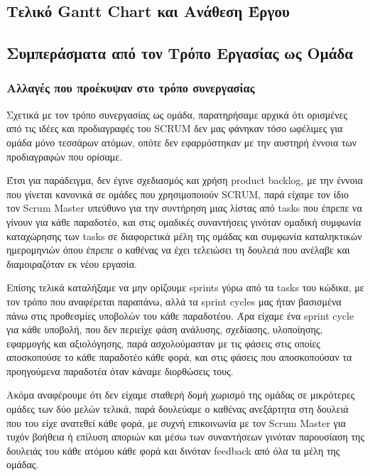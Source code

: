 \documentclass[12pt,a4paper]{article}
\begin{document}
\subsection{Τελικό Gantt Chart και Ανάθεση Έργου}

\subsection{Συμπεράσματα από τον Τρόπο Εργασίας ως Ομάδα}

\subsubsection{Αλλαγές που προέκυψαν στο τρόπο συνεργασίας}

Σχετικά με τον τρόπο συνεργασίας ως ομάδα, παρατηρήσαμε αρχικά ότι ορισμένες από τις ιδέες και προδιαγραφές του SCRUM δεν μας φάνηκαν τόσο ωφέλιμες για ομάδα μόνο τεσσάρων ατόμων, οπότε δεν εφαρμόστηκαν με την αυστηρή έννοια των προδιαγραφών που ορίσαμε.

Έτσι για παράδειγμα, δεν έγινε σχεδιασμός και χρήση product backlog, με την έννοια που γίνεται κανονικά σε ομάδες που χρησιμοποιούν SCRUM, παρά είχαμε τον ίδιο τον Scrum Master υπεύθυνο για την συντήρηση μιας λίστας από tasks που έπρεπε να γίνουν για κάθε παραδοτέο, και στις ομαδικές συναντήσεις γινόταν ομαδική συμφωνία καταχώρησης των tasks σε διαφορετικά μέλη της ομάδας και συμφωνία καταληκτικών ημερομηνιών όπου έπρεπε ο καθένας να έχει τελειώσει τη δουλειά που ανέλαβε και διαμοιραζόταν εκ νέου εργασία.

Επίσης τελικά καταλήξαμε να μην ορίζουμε sprints γύρω από τα tasks του κώδικα, με τον τρόπο που αναφέρεται παραπάνω, αλλά τα sprint cycles μας ήταν βασισμένα πάνω στις προθεσμίες υποβολών του κάθε παραδοτέου. Άρα είχαμε ένα sprint cycle για κάθε υποβολή, που δεν περιείχε φάση ανάλυσης, σχεδίασης, υλοποίησης, εφαρμογής και αξιολόγησης, παρά ασχολούμασταν με τις φάσεις στις οποίες αποσκοπούσε το κάθε παραδοτέο κάθε φορά, και στις φάσεις που αποσκοπούσαν τα προηγούμενα παραδοτέα όταν κάναμε διορθώσεις τους.

Ακόμα αναφέρουμε ότι δεν είχαμε σταθερή δομή χωρισμό της ομάδας σε μικρότερες ομάδες των δύο μελών τελικά, παρά δουλεύαμε ο καθένας ανεξάρτητα στη δουλειά που του είχε ανατεθεί κάθε φορά, με συχνή επικοινωνία με τον Scrum Master για τυχόν βοήθεια ή επίλυση αποριών και μέσω των συναντήσεων γινόταν παρουσίαση της δουλειάς του κάθε ατόμου κάθε φορά και δινόταν feedback από όλα τα μέλη της ομάδας.
\end{document}
